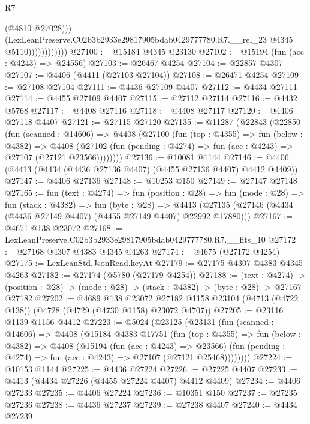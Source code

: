 \begin{lexlean}{R7}
\begin{coremodule}
                              (@4810 @27028)))
                          (LexLeanPreserve.C02b3b2933e29817905bdab0429777780.R7.__rel_23
                            @4345
                            @5110))))))))))))
@27100 := @15184 @4345 @23130
@27102 := @15194 (fun (acc : @4243) => @24556)
@27103 := @26467 @4254
@27104 := @22857 @4307
@27107 := @4406 (@4411 (@27103 @27104))
@27108 := @26471 @4254
@27109 := @27108 @27104
@27111 := @4436 @27109 @4407
@27112 := @4434 @27111
@27114 := @4455 @27109 @4407
@27115 := @27112 @27114
@27116 := @4432 @5768
@27117 := @4408 @27116
@27118 := @4408 @27117
@27120 := @4406 @27118 @4407
@27121 := @27115 @27120
@27135 := @11287
    (@22843
      (@22850
        (fun (scanned : @14606) =>
        @4408
          (@27100
            (fun (top : @4355) =>
            fun (below : @4382) =>
            @4408
              (@27102 (fun (pending : @4274) => fun (acc : @4243) => @27107 (@27121 @23566))))))))
@27136 := @10081 @1144
@27146 := @4406 (@4413 (@4434 (@4436 @27136 @4407) (@4455 @27136 @4407) @4412 @4409))
@27147 := @4406 @27136
@27148 := @10253 @150
@27149 := @27147 @27148
@27165 := fun (text : @4274) =>
  fun (position : @28) =>
  fun (mode : @28) =>
  fun (stack : @4382) =>
  fun (byte : @28) =>
  @4413 (@27135 (@27146 (@4434 (@4436 @27149 @4407) (@4455 @27149 @4407) @22992 @17880)))
@27167 := @4671 @138 @23072
@27168 := LexLeanPreserve.C02b3b2933e29817905bdab0429777780.R7.__fits_10
@27172 := @27168 @4307 @4383 @4345 @4263
@27174 := @4675 (@27172 @4254)
@27175 := LexLeanStd.JsonRead.keyAt
@27179 := @27175 @4307 @4383 @4345 @4263
@27182 := @27174 (@5780 (@27179 @4254))
@27188 := (text : @4274) ->
  (position : @28) -> (mode : @28) -> (stack : @4382) -> (byte : @28) -> @27167 @27182
@27202 := @4689
    @138
    @23072
    @27182
    @1158
    @23104
    (@4713 (@4722 @138))
    (@4728 (@4729 (@4730 @1158) @23072 @4707))
@27205 := @23116 @1139 @1156 @4412
@27223 := @5024
    (@23125
      (@23131
        (fun (scanned : @14606) =>
        @4408
          (@15184
            @4383
            @17751
            (fun (top : @4355) =>
            fun (below : @4382) =>
            @4408
              (@15194
                (fun (acc : @4243) => @23566)
                (fun (pending : @4274) => fun (acc : @4243) => @27107 (@27121 @25468))))))))
@27224 := @10153 @1144
@27225 := @4436 @27224
@27226 := @27225 @4407
@27233 := @4413 (@4434 @27226 (@4455 @27224 @4407) @4412 @4409)
@27234 := @4406 @27233
@27235 := @4406 @27224
@27236 := @10351 @150
@27237 := @27235 @27236
@27238 := @4436 @27237
@27239 := @27238 @4407
@27240 := @4434 @27239

\end{coremodule}
\end{lexlean}
